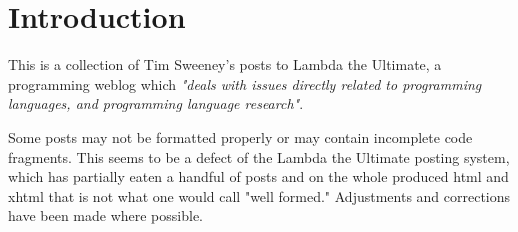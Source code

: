 \chapter{Introduction}

This is a collection of Tim Sweeney's posts to Lambda the Ultimate, a programming weblog which \textit{"deals with issues directly related to programming languages, and programming language research"}.

Some posts may not be formatted properly or may contain incomplete code fragments. This seems to be a defect of the Lambda the Ultimate posting system, which has partially eaten a handful of posts and on the whole produced html and xhtml that is not what one would call "well formed." Adjustments and corrections have been made where possible.
